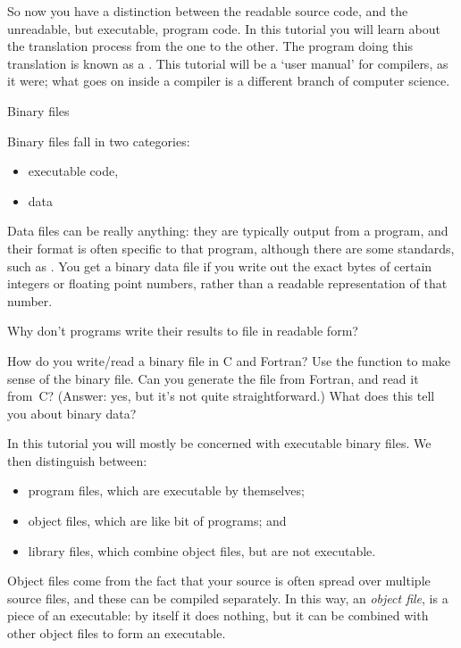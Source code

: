So now you have
a distinction between the readable source code, and the
unreadable, but executable, program code. In this tutorial you will
learn about the translation process from the one to the other. The
program doing this translation is known as a .
This tutorial will be a `user manual' for compilers, as it were; what
goes on inside a compiler is a different branch of computer science.

 {Binary files}

Binary files fall in two categories:
\begin{itemize}
\item executable code,
\item data
\end{itemize}

Data files can be really anything: they are typically output from
a program, and their format is often specific to that program,
although there are some standards, such as .
You get a binary data file if you write out the exact bytes
of certain integers or floating point numbers,
rather than a readable representation of that number.

\begin{exercise}
  Why don't programs write their results to file in readable form?
\end{exercise}

\begin{enrichment}
  How do you write/read a binary file in C and Fortran?
  Use the function  to make sense
  of the binary file.
  Can you generate the file from Fortran, and read it from~C?
  (Answer: yes, but it's not quite straightforward.)
  What does this tell you about binary data?

\end{enrichment}

In this tutorial you will mostly be concerned with executable binary files.
We then distinguish between:
\begin{itemize}
\item program files, which are executable by themselves;
\item object files, which are like bit of programs; and
\item library files, which combine object files, but are not executable.
\end{itemize}

Object files come from the fact that your source is often spread over multiple
source files, and these can be compiled separately.
In this way, an \emph{object file}, is
a piece of an executable: by itself it does nothing, but
it can be combined with other object files to form an executable.

